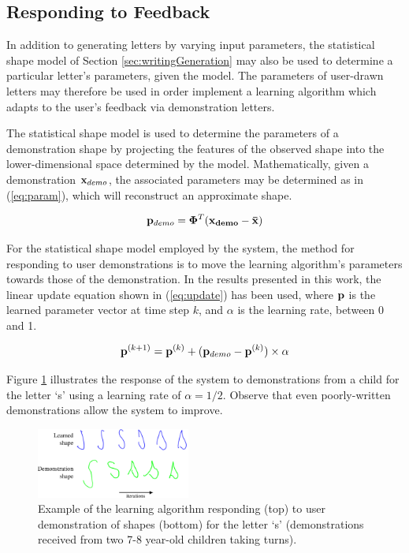 \documentclass{sig-alternate}
\begin{document}
\subsection{Responding to Feedback}\label{sec:learningAlg}

In addition to generating letters by varying input parameters, the statistical 
shape model of Section \ref{sec:writingGeneration} may also be used 
to determine a particular letter's parameters, given the model. The parameters of user-drawn
letters may therefore be used in order implement a 
learning algorithm which adapts to the user's feedback via demonstration letters.

The statistical shape model is used to determine the parameters of a
demonstration shape by projecting the features of the observed shape into the
lower-dimensional space determined by the model. Mathematically, given a
demonstration ${\bf x}_{demo}$, the associated parameters may be determined as in
(\ref{eq:param}), which will reconstruct an approximate shape.

\begin{equation}\label{eq:param}
{\bf p}_{demo} ={\bf \Phi}^T ({\bf{x}_{demo}}-\bf{\bar{x}})
\end{equation}


For the statistical shape model employed by the system, the method for
responding to user demonstrations is to move the learning algorithm's parameters
towards those of the demonstration. In the results presented in this work, the
linear update equation shown in (\ref{eq:update}) has been used, where ${\bf p}$ is the
learned parameter vector at time step $k$, and $\alpha$ is the learning rate,
between 0 and 1.  

\begin{equation}\label{eq:update}
{\bf p}^{(k+1)} = {\bf p}^{(k)} + ({\bf p}_{demo}-{\bf
p}^{(k)})\times\alpha
\end{equation}

Figure \ref{fig:demonstrationShapes2} illustrates the response of the system to
demonstrations from a child for the letter `s' using a learning rate of
$\alpha=1/2$. Observe that even poorly-written demonstrations allow the system to improve.

\begin{figure}[thpb]
    \centering
    \includegraphics[width=0.45\textwidth]{figures/learningSdemo}
    \caption{\label{fig:demonstrationShapes2}Example of the learning algorithm
    responding (top) to user demonstration of shapes (bottom) for the letter `s' (demonstrations received from two 7-8 year-old children taking turns).}
\end{figure}
\end{document}

